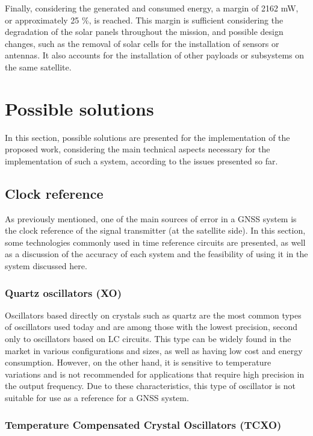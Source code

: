 Finally, considering the generated and consumed energy, a margin of 2162 mW, or approximately 25 \%, is reached. This margin is sufficient considering the degradation of the solar panels throughout the mission, and possible design changes, such as the removal of solar cells for the installation of sensors or antennas. It also accounts for the installation of other payloads or subsystems on the same satellite.

\section{Possible solutions}

In this section, possible solutions are presented for the implementation of the proposed work, considering the main technical aspects necessary for the implementation of such a system, according to the issues presented so far.

\subsection{Clock reference}

As previously mentioned, one of the main sources of error in a GNSS system is the clock reference of the signal transmitter (at the satellite side). In this section, some technologies commonly used in time reference circuits are presented, as well as a discussion of the accuracy of each system and the feasibility of using it in the system discussed here.

\subsubsection{Quartz oscillators (XO)}

Oscillators based directly on crystals such as quartz are the most common types of oscillators used today and are among those with the lowest precision, second only to oscillators based on LC circuits. This type can be widely found in the market in various configurations and sizes, as well as having low cost and energy consumption. However, on the other hand, it is sensitive to temperature variations and is not recommended for applications that require high precision in the output frequency. Due to these characteristics, this type of oscillator is not suitable for use as a reference for a GNSS system.

\subsubsection{Temperature Compensated Crystal Oscillators (TCXO)}

